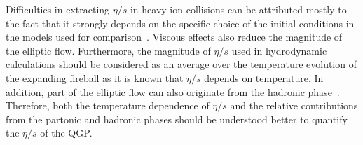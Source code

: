 Difficulties in extracting $\eta/s$ in heavy-ion collisions can be attributed mostly to the fact that it strongly depends on the specific choice of the initial conditions in the models used for comparison~\cite{Romatschke:2007mq,Luzum:2012wu,Shen:2011zc}.
Viscous effects also reduce the magnitude of the elliptic flow. Furthermore, the magnitude of $\eta/s$ used in hydrodynamic calculations should be considered as an average over the temperature evolution of the expanding fireball as it is known that $\eta/s$ depends on temperature. 
In addition, part of the elliptic flow can also originate from the hadronic phase~\cite{Bozek:2011ua,Rose:2014fba,Ryu:2015vwa}. Therefore,
both the temperature dependence of $\eta/s$ and the relative contributions from the partonic and hadronic phases should be understood better to quantify the $\eta/s$ of the QGP.


